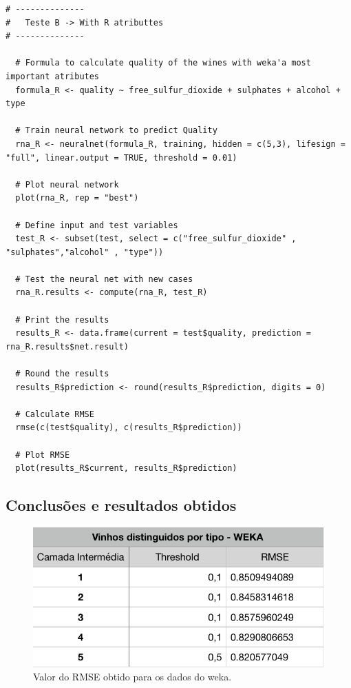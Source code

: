 \documentclass{report}
\begin{document}
\begin{verbatim}
# --------------
#	Teste B	-> With R atributtes
# --------------

  # Formula to calculate quality of the wines with weka'a most important atributes
  formula_R <- quality ~ free_sulfur_dioxide + sulphates + alcohol + type
  
  # Train neural network to predict Quality
  rna_R <- neuralnet(formula_R, training, hidden = c(5,3), lifesign = "full", linear.output = TRUE, threshold = 0.01)
  
  # Plot neural network
  plot(rna_R, rep = "best")
  
  # Define input and test variables
  test_R <- subset(test, select = c("free_sulfur_dioxide" , "sulphates","alcohol" , "type"))
  
  # Test the neural net with new cases
  rna_R.results <- compute(rna_R, test_R)
  
  # Print the results
  results_R <- data.frame(current = test$quality, prediction = rna_R.results$net.result)
  
  # Round the results
  results_R$prediction <- round(results_R$prediction, digits = 0)
  
  # Calculate RMSE
  rmse(c(test$quality), c(results_R$prediction))
  
  # Plot RMSE
  plot(results_R$current, results_R$prediction)

\end{verbatim}



\subsection{Conclusões e resultados obtidos}

\begin{figure}[h!]
\centering
\includegraphics[scale=0.5]{tabelas/5} 
\caption{Valor do RMSE obtido para os dados do weka.}
\end{figure}
\end{document}
